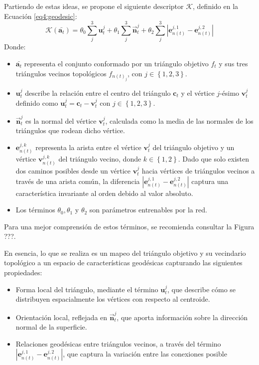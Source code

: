 Partiendo de estas ideas, se propone el siguiente descriptor $\mathcal{K}$, definido en la Ecuación \ref{eq4:geodesic}:
\begin{equation}
\label{eq4:geodesic}
    \mathcal{K}
(\bar{\textbf{a}_{t}}) = \theta_{0} \sum_{j}^{3} \textbf{u}_{t}^{j} + \theta_{1} \sum_{j}^{3}  \overrightarrow{\textbf{n}}_{t}^{j} + \theta_{2} \sum_{j}^{3} |\textbf{e}_{n(t)}^{j,1} - \textbf{e}_{n(t)}^{j,2}|
\end{equation}
Donde: 
\begin{itemize}
    \item $\bar{\textbf{a}_{t}}$ representa el conjunto conformado por un triángulo objetivo $f_{t}$ y sus tres triángulos vecinos topológicos $f_{n(t)_j}$, con $j \in \left\{1,2,3\right\}$.
    \item $\textbf{u}_{t}^{j}$ describe la relación entre el centro del triángulo $\textbf{c}_t$ y el vértice $j$-ésimo $\textbf{v}_{t}^j$ definido como  $\textbf{u}_{t}^{j} = \textbf{c}_t - \textbf{v}_t^j$ con $j \in \left\{1,2,3\right\}$.
    \item $\overrightarrow{\textbf{n}}_{t}^{j}$ es la normal del vértice $\textbf{v}_t^j$, calculada como la media de las normales de los triángulos que rodean dicho vértice.
    \item $\textbf{e}_{n(t)}^{j,k}$ representa la arista entre el vértice $\textbf{v}_{t}^j$ del triángulo objetivo y un vértice $\textbf{v}_{n(t)}^{j,k}$ del triángulo vecino, donde $k \in \left\{1,2\right\}$. Dado que solo existen dos caminos posibles desde un vértice $\textbf{v}_t^j$ hacia vértices de triángulos vecinos a través de una arista común, la diferencia $|\textbf{e}_{n(t)}^{j,1} - \textbf{e}_{n(t)}^{j,2}|$ captura una característica invariante al orden debido al valor absoluto.
    \item Los términos $\theta_0, \theta_1 $ y $\theta_2$ son parámetros entrenables por la red.
\end{itemize}
Para una mejor comprensión de estos términos, se recomienda consultar la Figura ???.

En esencia, lo que se realiza es un mapeo del triángulo objetivo y su vecindario topológico a un espacio de características geodésicas capturando las siguientes propiedades:
\begin{itemize}
    \item Forma local del triángulo, mediante el término $\textbf{u}_{t}^{j}$, que describe cómo se distribuyen espacialmente los vértices con respecto al centroide.
    \item Orientación local, reflejada en $\overrightarrow{\textbf{n}}_{t}^{j}$, que aporta información sobre la dirección normal de la superficie.
    \item Relaciones geodésicas entre triángulos vecinos, a través del término $|\textbf{e}_{n(t)}^{j,1} - \textbf{e}_{n(t)}^{j,2}|$, que captura la variación entre las conexiones posible
\end{itemize}

